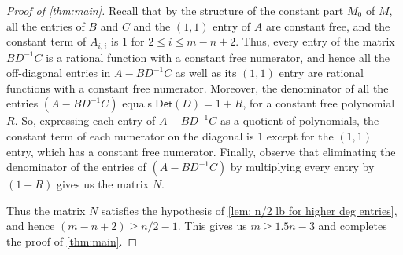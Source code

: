 \documentclass[10pt,a4paper]{article}
\newcommand{\Det}{\mathsf{Det}}
\begin{document}
\begin{proof}[Proof of \autoref{thm:main}]
Recall that by the structure of the constant part $M_0$ of $M$, all the entries of $B$ and $C$ and the $(1,1)$ entry of $A$ are constant free, and the constant term of $A_{i,i}$ is $1$ for $2 \le i \le m-n+2$. Thus, every entry of the matrix $BD^{-1}C$ is a rational function with a constant free numerator, and hence all the off-diagonal entries in $A - BD^{-1}C$ as well as its $(1,1)$ entry are rational functions with a constant free numerator. Moreover, the denominator of all the entries $\left(A - BD^{-1}C\right)$  equals $\Det(D) = 1 + R$, for a constant free polynomial $R$. So, expressing each entry of $A-BD^{-1}C$ as a quotient of polynomials, the constant term of each numerator on the diagonal  is $1$ except for the $(1,1)$ entry, which has a constant free numerator.  Finally, observe that eliminating the denominator of the entries of  $\left(A - BD^{-1}C\right)$ by multiplying every entry by $(1 + R)$ gives us the  matrix $N$.

Thus the matrix $N$ satisfies the hypothesis of \autoref{lem: n/2 lb for higher deg entries}, and hence $(m - n + 2) \geq n/2 -1$. This gives us $m \geq 1.5n - 3$ and completes the proof of \autoref{thm:main}.  
\end{proof}
\end{document}
